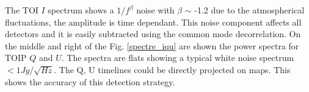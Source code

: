 \documentclass[twocolumn,traditabstract]{aa}
\begin{document}



The TOI $I$ spectrum shows a $1/f^\beta$ noise with $\beta$ $\sim$ -1.2 due to
the atmospherical fluctuations, the amplitude is time dependant. This noise
component affects all detectors and it is easily subtracted using the common
mode decorrelation.  On the middle and right of the Fig. \ref{spectre_iqu} are
shown the power spectra for TOIP $Q$ and $U$. The spectra are flats showing a
typical white noise spectrum $ < 1 Jy/\sqrt{Hz}$. The Q, U timelines could be
directly projected on maps. This shows the accuracy of this detection strategy.

\end{document}
